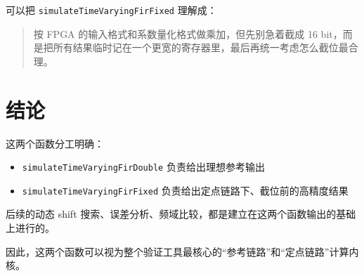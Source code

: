 \documentclass[12pt,a4paper]{article}
\begin{document}
可以把 \texttt{simulateTimeVaryingFirFixed} 理解成：

\begin{quote}
按 FPGA 的输入格式和系数量化格式做乘加，但先别急着截成 16 bit，而是把所有结果临时记在一个更宽的寄存器里，最后再统一考虑怎么截位最合理。
\end{quote}

\section{结论}

这两个函数分工明确：

\begin{itemize}
\item \texttt{simulateTimeVaryingFirDouble} 负责给出理想参考输出
\item \texttt{simulateTimeVaryingFirFixed} 负责给出定点链路下、截位前的高精度结果
\end{itemize}

后续的动态 shift 搜索、误差分析、频域比较，都是建立在这两个函数输出的基础上进行的。

因此，这两个函数可以视为整个验证工具最核心的“参考链路”和“定点链路”计算内核。
\end{document}
